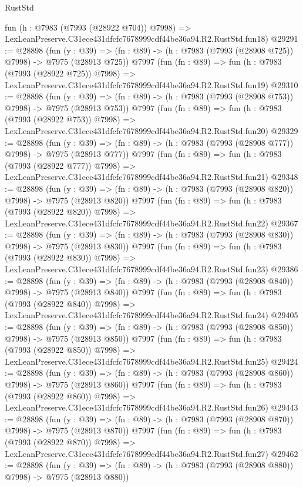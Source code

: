 \begin{lexlean}{RustStd}
\begin{coremodule}
    fun (h : @7983 (@7993 (@28922 @704)) @7998) =>
    LexLeanPreserve.C31ece431dfcfc7678999cdf44be36a94.R2.RustStd.fun18)
@29291 := @28898
    (fun (y : @39) => (fn : @89) -> (h : @7983 (@7993 (@28908 @725)) @7998) -> @7975 (@28913 @725))
    @7997
    (fun (fn : @89) =>
    fun (h : @7983 (@7993 (@28922 @725)) @7998) =>
    LexLeanPreserve.C31ece431dfcfc7678999cdf44be36a94.R2.RustStd.fun19)
@29310 := @28898
    (fun (y : @39) => (fn : @89) -> (h : @7983 (@7993 (@28908 @753)) @7998) -> @7975 (@28913 @753))
    @7997
    (fun (fn : @89) =>
    fun (h : @7983 (@7993 (@28922 @753)) @7998) =>
    LexLeanPreserve.C31ece431dfcfc7678999cdf44be36a94.R2.RustStd.fun20)
@29329 := @28898
    (fun (y : @39) => (fn : @89) -> (h : @7983 (@7993 (@28908 @777)) @7998) -> @7975 (@28913 @777))
    @7997
    (fun (fn : @89) =>
    fun (h : @7983 (@7993 (@28922 @777)) @7998) =>
    LexLeanPreserve.C31ece431dfcfc7678999cdf44be36a94.R2.RustStd.fun21)
@29348 := @28898
    (fun (y : @39) => (fn : @89) -> (h : @7983 (@7993 (@28908 @820)) @7998) -> @7975 (@28913 @820))
    @7997
    (fun (fn : @89) =>
    fun (h : @7983 (@7993 (@28922 @820)) @7998) =>
    LexLeanPreserve.C31ece431dfcfc7678999cdf44be36a94.R2.RustStd.fun22)
@29367 := @28898
    (fun (y : @39) => (fn : @89) -> (h : @7983 (@7993 (@28908 @830)) @7998) -> @7975 (@28913 @830))
    @7997
    (fun (fn : @89) =>
    fun (h : @7983 (@7993 (@28922 @830)) @7998) =>
    LexLeanPreserve.C31ece431dfcfc7678999cdf44be36a94.R2.RustStd.fun23)
@29386 := @28898
    (fun (y : @39) => (fn : @89) -> (h : @7983 (@7993 (@28908 @840)) @7998) -> @7975 (@28913 @840))
    @7997
    (fun (fn : @89) =>
    fun (h : @7983 (@7993 (@28922 @840)) @7998) =>
    LexLeanPreserve.C31ece431dfcfc7678999cdf44be36a94.R2.RustStd.fun24)
@29405 := @28898
    (fun (y : @39) => (fn : @89) -> (h : @7983 (@7993 (@28908 @850)) @7998) -> @7975 (@28913 @850))
    @7997
    (fun (fn : @89) =>
    fun (h : @7983 (@7993 (@28922 @850)) @7998) =>
    LexLeanPreserve.C31ece431dfcfc7678999cdf44be36a94.R2.RustStd.fun25)
@29424 := @28898
    (fun (y : @39) => (fn : @89) -> (h : @7983 (@7993 (@28908 @860)) @7998) -> @7975 (@28913 @860))
    @7997
    (fun (fn : @89) =>
    fun (h : @7983 (@7993 (@28922 @860)) @7998) =>
    LexLeanPreserve.C31ece431dfcfc7678999cdf44be36a94.R2.RustStd.fun26)
@29443 := @28898
    (fun (y : @39) => (fn : @89) -> (h : @7983 (@7993 (@28908 @870)) @7998) -> @7975 (@28913 @870))
    @7997
    (fun (fn : @89) =>
    fun (h : @7983 (@7993 (@28922 @870)) @7998) =>
    LexLeanPreserve.C31ece431dfcfc7678999cdf44be36a94.R2.RustStd.fun27)
@29462 := @28898
    (fun (y : @39) => (fn : @89) -> (h : @7983 (@7993 (@28908 @880)) @7998) -> @7975 (@28913 @880))

\end{coremodule}
\end{lexlean}
